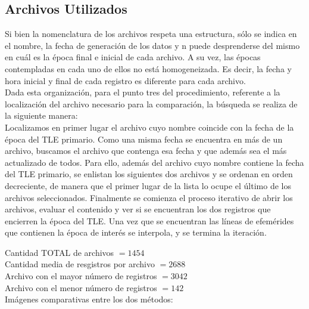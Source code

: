 \subsection{Archivos Utilizados}
Si bien la nomenclatura de los archivos respeta una estructura, s\'olo se indica en el nombre, la fecha de generaci\'on de los datos y n puede desprenderse del mismo en cu\'al es la \'epoca final e inicial de cada archivo. A su vez, las \'epocas contempladas en cada uno de ellos no está homogeneizada. Es decir, la fecha y hora inicial y final de cada registro es diferente para cada archivo.\\
Dada esta organizaci\'on, para el punto tres del procedimiento, referente a la localizaci\'on del archivo necesario para la comparaci\'on, la b\'usqueda se realiza de la siguiente manera:\\
Localizamos en primer lugar el archivo cuyo nombre coincide con la fecha de la \'epoca del TLE primario.
Como una misma fecha se encuentra en m\'as de un archivo, buscamos el archivo que contenga esa fecha y que adem\'as sea el m\'as actualizado de todos. Para ello, además del archivo cuyo nombre contiene la fecha del TLE primario, se enlistan los siguientes dos archivos y se ordenan en orden decreciente, de manera que el primer lugar de la lista lo ocupe el \'ultimo de los archivos seleccionados. Finalmente se comienza el proceso iterativo de abrir los archivos, evaluar el contenido y ver si se encuentran los dos registros que encierren la \'epoca del TLE.
Una vez que se encuentran las l\'ineas de efem\'erides que contienen la \'epoca de inter\'es se interpola, y se termina la iteraci\'on.

\noindent
Cantidad TOTAL de archivos $=  1454$\\
Cantidad media de resgistros por archivo $=  2688$\\
Archivo con el mayor n\'umero de registros $=  3042$\\
Archivo con el menor n\'umero de registros $=  142$\\

Im\'agenes comparativas entre los dos m\'etodos:\\


